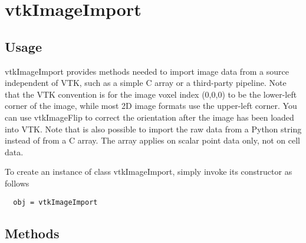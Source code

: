 \section{vtkImageImport}

\subsection{Usage}

 vtkImageImport provides methods needed to import image data from a source
 independent of VTK, such as a simple C array or a third-party pipeline.
 Note that the VTK convention is for the image voxel index (0,0,0) to be
 the lower-left corner of the image, while most 2D image formats use
 the upper-left corner.  You can use vtkImageFlip to correct the 
 orientation after the image has been loaded into VTK.
 Note that is also possible to import the raw data from a Python string
 instead of from a C array. The array applies on scalar point data only, not
 on cell data.

To create an instance of class vtkImageImport, simply
invoke its constructor as follows
\begin{verbatim}
  obj = vtkImageImport
\end{verbatim}
\subsection{Methods}

